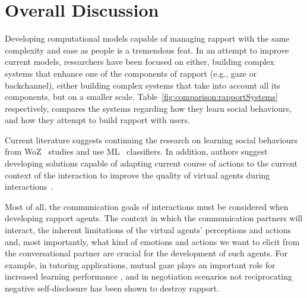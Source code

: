 \section{Overall Discussion}
\label{subsec:RelWorkDiscussion}

Developing computational models capable of managing rapport with the same complexity and ease as people is a tremendous feat. In an attempt to improve current models, researchers have been focused on either, building complex systems that enhance one of the components of rapport (e.g., gaze or backchannel), either building complex systems that take into account all its components, but on a smaller scale. Table~\ref{fig:comparison:rapportSystems} respectively, compares the systems regarding how they learn social behaviours, and how they attempt to build rapport with users.

Current literature suggests continuing the research on learning social behaviours from \ac{WoZ}~\cite{Sequeira2016, Knox2014, Papangelis2014} studies and use \ac{ML}~\cite{Thomaz2006, Kok2012, Zhao2014, Papangelis2014} classifiers. In addition, authors suggest developing solutions capable of adapting current course of actions to the current context of the interaction to improve the quality of virtual agents during interactions~\cite{Kopp2007, Zwiers2011, Reidsma2011, Visser2014}.

Most of all, the communication goals of interactions must be considered when developing rapport agents. The context in which the communication partners will interact, the inherent limitations of the virtual agents' perceptions and actions and, most importantly, what kind of emotions and actions we want to elicit from the conversational partner are crucial for the development of such agents. For example, in tutoring applications, mutual gaze plays an important role for increased learning performance \cite{OTTESON1980, SHERWOOD1987, Fry1975}, and in negotiation scenarios not reciprocating negative self-disclosure has been shown to destroy rapport\cite{Bronstein2012}.

